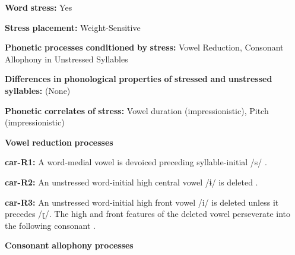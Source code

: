 \documentclass[output=paper]{langsci/langscibook}
\begin{document}
\begin{styleBody}
\textbf{Word} \textbf{stress:} Yes
\end{styleBody}

\begin{styleBody}
\textbf{Stress} \textbf{placement:} Weight-Sensitive
\end{styleBody}

\begin{styleBody}
\textbf{Phonetic} \textbf{processes} \textbf{conditioned} \textbf{by} \textbf{stress:} Vowel Reduction, Consonant Allophony in Unstressed Syllables
\end{styleBody}

\begin{styleBody}
\textbf{Differences} \textbf{in} \textbf{phonological} \textbf{properties} \textbf{of} \textbf{stressed} \textbf{and} \textbf{unstressed} \textbf{syllables:} (None)
\end{styleBody}

\begin{styleBody}
\textbf{Phonetic} \textbf{correlates} \textbf{of} \textbf{stress:} Vowel duration (impressionistic), Pitch (impressionistic)
\end{styleBody}

\begin{styleBody}
\textbf{Vowel} \textbf{reduction} \textbf{processes}
\end{styleBody}

\begin{styleBody}
\textbf{car-R1:} A word-medial vowel is devoiced preceding syllable-initial /s/ \citep[38]{Peasgood1972}.
\end{styleBody}

\begin{styleBody}
\textbf{car-R2:} An unstressed word-initial high central vowel /ɨ/ is deleted \citep[40]{Courtz2008}.
\end{styleBody}

\begin{styleBody}
\textbf{car-R3:} An unstressed word-initial high front vowel /i/ is deleted unless it precedes /ɽ/. The high and front features of the deleted vowel perseverate into the following consonant \citep[41]{Courtz2008}.
\end{styleBody}

\begin{styleBody}
\textbf{Consonant} \textbf{allophony} \textbf{processes}
\end{styleBody}
\end{document}
